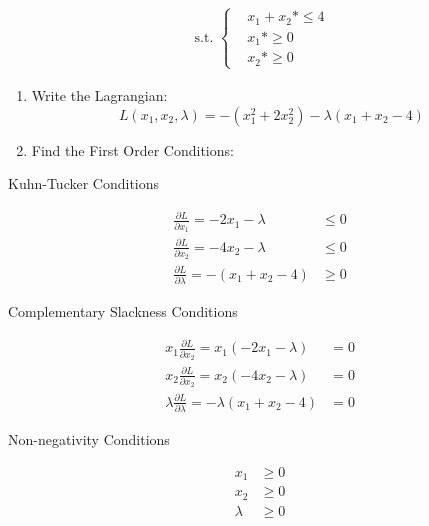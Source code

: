 \documentclass[]{book}
\theoremstyle{definition}
\theoremstyle{definition}
\theoremstyle{definition}
\theoremstyle{remark}
\begin{document}
\begin{align*}
\text{ s.t. } 
\begin{cases}
&x_1 + x_2 *\le 4\\
&x_1 *\ge 0\\
&x_2 *\ge 0
\end{cases}
\end{align*}

\begin{enumerate}
\def\labelenumi{\arabic{enumi}.}
\item
  Write the Lagrangian:
  \[L(x_1, x_2, \lambda) =  -(x_1^2 + 2x_2^2) - \lambda(x_1 + x_2 - 4)\]
\item
  Find the First Order Conditions:
\end{enumerate}

Kuhn-Tucker Conditions

\begin{align*}
\frac{\partial L}{\partial x_1} = -2x_1 - \lambda  &\leq 0\\
\frac{\partial L}{\partial x_2}  = -4x_2 - \lambda & \leq  0\\
\frac{\partial L}{\partial \lambda} = -(x_1 + x_2 - 4)& \geq 0
\end{align*}

Complementary Slackness Conditions

\begin{align*}
x_1\frac{\partial L}{\partial x_2} = x_1(-2x_1 - \lambda)  &= 0\\
x_2\frac{\partial L}{\partial x_2} = x_2(-4x_2 - \lambda)  &= 0\\
\lambda\frac{\partial L}{\partial \lambda} = -\lambda(x_1 + x_2 - 4)&= 0
\end{align*}

Non-negativity Conditions

\begin{align*}
x_1 & \geq  0\\
x_2 & \geq 0\\
\lambda & \geq 0
\end{align*}
\end{document}
